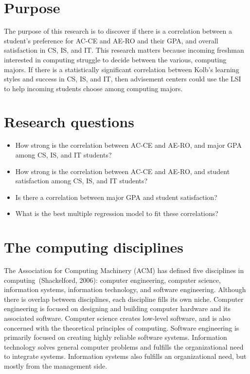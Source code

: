 \section{Purpose}
The purpose of this research is to discover if there is a correlation between a student's preference for AC-CE and AE-RO and their GPA, and overall satisfaction in CS, IS, and IT. This research matters because incoming freshman interested in computing struggle to decide between the various, computing majors. If there is a statistically significant correlation between Kolb's learning styles and success in CS, IS, and IT, then advisement centers could use the LSI to help incoming students choose among computing majors.

\section{Research questions}
\begin{itemize}
  \item How strong is the correlation between AC-CE and AE-RO, and major GPA among CS, IS, and IT students?
  \item How strong is the correlation between AC-CE and AE-RO, and student satisfaction among CS, IS, and IT students?
  \item Is there a correlation between major GPA and student satisfaction?
  \item What is the best multiple regression model to fit these correlations?
\end{itemize}

\section{The computing disciplines}
The Association for Computing Machinery (ACM) has defined five disciplines in computing~(Shackelford, 2006): computer engineering, computer science, information systems, information technology, and software engineering. Although there is overlap between disciplines, each discipline fills its own niche. Computer engineering is focused on designing and building computer hardware and its associated software. Computer science creates low-level software, and is also concerned with the theoretical principles of computing. Software engineering is primarily focused on creating highly reliable software systems. Information technology solves general computer problems and fulfills the organizational need to integrate systems. Information systems also fulfills an organizational need, but mostly from the management side.


